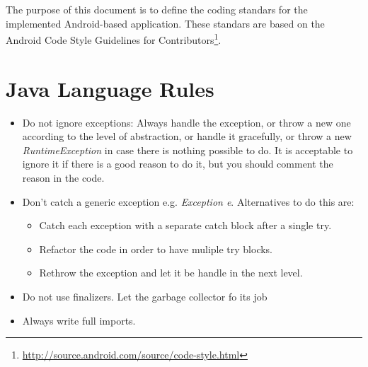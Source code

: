 \lstset{language=Java}

The purpose of this document is to define the coding standars for the implemented Android-based application. These standars are based
on the Android Code Style Guidelines for Contributors\footnote{\url{http://source.android.com/source/code-style.html}}.

\section{Java Language Rules}

\begin{itemize}
 \item Do not ignore exceptions: Always handle the exception, or throw a new one according to the level of abstraction, 
 or handle it gracefully, or throw a new \textit{RuntimeException} in case there is nothing possible to do. 
 It is acceptable to ignore it if there is a good reason to do it, but you should comment the reason in the code.
 \item Don't catch a generic exception e.g. \textit{Exception e}. Alternatives to do this are:
 \begin{itemize}
    \item Catch each exception with a separate catch block after a single try.
    \item Refactor the code in order to have muliple try blocks.
    \item Rethrow the exception and let it be handle in the next level.
  \end{itemize}
  \item Do not use finalizers. Let the garbage collector fo its job
  \item Always write full imports. 

\end{itemize}

